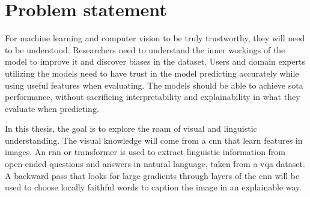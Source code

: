 \label{sec:1_2_problem_statement}

\begin{comment}
In a short and precise way, state what your research is about in this thesis. It can be in the form of a (set of) research questions, goals/aims, or objectives (or a mix) - but it should clearly state what the problems or challenges you are addressing.

Alternatively, one can state a research hypothesis, but if so, it should follow the rules of what a hypothesis is. A hypothesis is a statement that introduces a research question and proposes an expected result. It is an integral part of the scientific method that forms the basis of scientific experiments. Therefore, you need to be careful and thorough when building your hypothesis, following the “rules”.
\end{comment}

\section{Problem statement}

For machine learning and computer vision to be truly trustworthy, they will need to be understood. Researchers need to understand the inner workings of the model to improve it and discover biases in the dataset. Users and domain experts utilizing the models need to have trust in the model predicting accurately while using useful features when evaluating. The models should be able to achieve \gls{sota} performance, without sacrificing interpretability and explainability in what they evaluate when predicting. 

In this thesis, the goal is to explore the roam of visual and linguistic understanding.
The visual knowledge will come from a \gls{cnn} that learn features in images. An \gls{rnn} \cite{rumelhartLearningRepresentationsBackpropagating1986, choLearningPhraseRepresentations2014, sutskeverSequenceSequenceLearning2014, bahdanauNeuralMachineTranslation2016} or transformer is used to extract linguistic information from open-ended questions and answers in natural language, taken from a \gls{vqa} dataset. A backward pass that looks for large gradients through layers of the \gls{cnn} will be used to choose locally faithful words to caption the image in an explainable way. 


